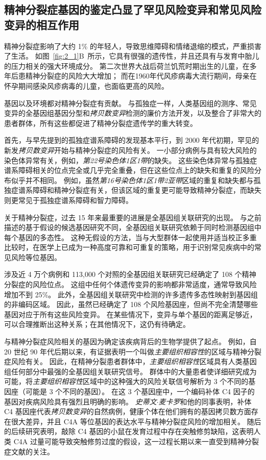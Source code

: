 \subsection{精神分裂症基因的鉴定凸显了罕见风险变异和常见风险变异的相互作用}

精神分裂症影响了大约 1\% 的年轻人，导致思维障碍和情绪退缩的模式，严重损害了生活。
如图~\ref{fig:2_1}B~所示，它具有很强的遗传性，并且还具有与发育中胎儿的压力相关的强大环境成分。
第二次世界大战后荷兰饥荒时期出生的儿童，在多年后患精神分裂症的风险大大增加；
而在1960年代风疹病毒大流行期间，母亲在怀孕期间感染风疹病毒的儿童，也面临更高的风险。

基因以及环境都对精神分裂症有贡献。
与孤独症一样，人类基因组的测序、常见变异的全基因组基因分型和\textit{拷贝数变异}检测的廉价方法开发，以及整合了非常大的患者群体，所有这些都促进了精神分裂症遗传学的重大转变。

首先，与早先提到的孤独症谱系障碍的发现基本平行，到 2000 年代初期，罕见的新发\textit{拷贝数变异}开始与精神分裂症的风险有关。
一小部分病例与具有较大风险的染色体异常有关，例如，\textit{第22号染色体1区1带}的缺失。
这些染色体异常与孤独症谱系障碍相关的位点完全或几乎完全重叠，但在这些位点上的缺失和重复的风险分布似乎并不相同。
例如，虽然\textit{第16号染色体1区1带2亚带}区域的重复和缺失都与孤独症谱系障碍和精神分裂症有关，但该区域的重复更可能导致精神分裂症，而缺失则更常见于孤独症谱系障碍和智力障碍。


关于精神分裂症，过去 15 年来最重要的进展是全基因组关联研究的出现。
与之前描述的基于假设的候选基因研究不同，全基因组关联研究依赖于同时检测基因组中每个基因的多态性。
这种无假设的方法，当与大型群体一起使用并适当校正多重比较时，在医学上已成为一种高度可靠和可重复的策略，用于识别常见疾病中的常见风险等位基因。


涉及近 4 万个病例和 113,000 个对照的全基因组关联研究已经确定了 108 个精神分裂症的风险位点。 
这组中任何个体遗传变异的影响都非常适度，通常导致风险增加不到 25\%。
此外，全基因组关联研究中检测的许多遗传多态性映射到基因组的非编码区域。
因此，虽然已经确定了 108 个风险基因座，但尚不完全清楚哪些基因对应于所有这些风险变异。
在某些情况下，变异与单个基因的距离足够近，可以合理推断出这种关系；在其他情况下，这仍有待确定。


与精神分裂症风险相关的基因为确定该疾病背后的生物学提供了起点。
例如，自 20 世纪 90 年代后期以来，有证据表明一个叫做\textit{主要组织相容性}的区域与精神分裂症风险有关。
因此，在精神分裂患者群体中，\textit{主要组织相容性}区域具有人类基因组任何部分中最强的全基因组关联研究信号。
群体中的大量患者使详细研究成为可能，将\textit{主要组织相容性}区域中的这种强大的风险关联信号解析为 3 个不同的基因座（可能是 3 个不同的基因）。
在这 3 个基因座中，一个编码补体 C4 因子的基因对疾病风险具有强烈且明确的影响。
\textit{史蒂文$\cdot$麦卡罗}和他的同事表明，补体 C4 基因座代表\textit{拷贝数变异}的自然病例，健康个体在他们拥有的基因拷贝数方面存在很大差异，并且 C4A 等位基因的表达水平与精神分裂症风险的增加相关。
随后的后续研究表明，敲除 C4 基因的小鼠在发育过程中存在突触修剪缺陷，这表明人类 C4A 过量可能导致突触修剪过度的假设，这一过程长期以来一直受到精神分裂症文献的关注。

